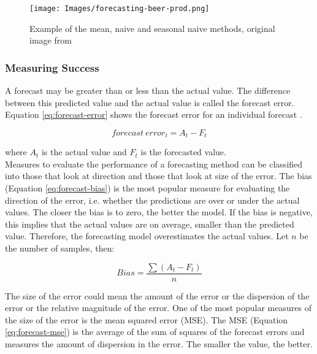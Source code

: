 \begin{figure}[H]
\begin{center}
    \texttt{[image: Images/forecasting-beer-prod.png]}
    \caption{Example of the mean, naive and seasonal naive methods, original image from \cite{forecasting-book}}
    \label{fig:forecasting}
\end{center}
\end{figure}

\subsubsection{Measuring Success}

A forecast may be greater than or less than the actual value. The difference between this predicted value and the actual value is called the forecast error. Equation \ref{eq:forecast-error} shows the forecast error for an individual forecast \cite{forecasting-performance-measures}.

\begin{equation}
\label{eq:forecast-error}
    forecast\ error_t = A_t - F_t
\end{equation}

\noindent where $A_t$ is the actual value and $F_t$ is the forecasted value. \\

Measures to evaluate the performance of a forecasting method can be classified into those that look at direction and those that look at size of the error. The bias (Equation \ref{eq:forecast-bias}) is the most popular measure for evaluating the direction of the error, i.e. whether the predictions are over or under the actual values. The closer the bias is to zero, the better the model. If the bias is negative, this implies that the actual values are on average, smaller than the predicted value. Therefore, the forecasting model overestimates the actual values. Let $n$ be the number of samples, then:

\begin{equation}
\label{eq:forecast-bias}
    Bias = \frac{\sum(A_t-F_t)}{n}
\end{equation}

The size of the error could mean the amount of the error or the dispersion of the error or the relative magnitude of the error. One of the most popular measures of the size of the error is the mean squared error (MSE). The MSE (Equation \ref{eq:forecast-mse}) is the average of the sum of squares of the forecast errors and measures the amount of dispersion in the error. The smaller the value, the better.

